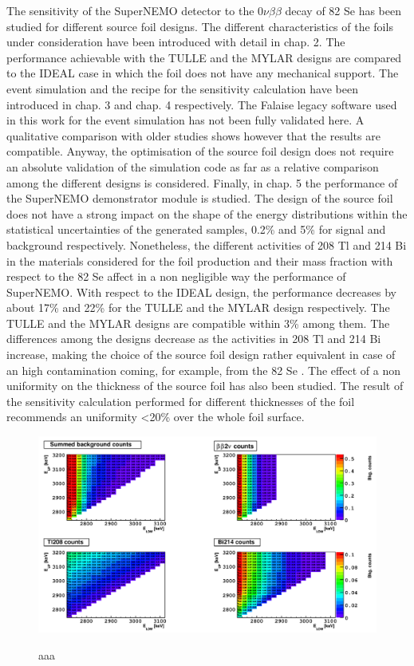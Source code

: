 \documentclass[main.tex]{subfiles}
\begin{document}
\NI The sensitivity of the SuperNEMO detector to the 0$\nu\beta\beta$ decay of 82 Se has been studied for different source foil designs. The different characteristics of the foils under consideration have been introduced with detail in chap. 2. The performance achievable with the TULLE and the MYLAR designs are compared to the IDEAL case in which the foil does not have any mechanical support. The event simulation and the recipe for the sensitivity calculation have been introduced in chap. 3 and chap. 4 respectively. The Falaise legacy software used in this work for the event simulation has not been fully validated here. A qualitative comparison with older studies shows however that the results are compatible. Anyway, the optimisation of the source foil design does not require an absolute validation of the simulation code as far as a relative comparison among the different designs is considered. Finally, in chap. 5 the performance of the SuperNEMO demonstrator module is studied. The design of the source foil does not have a strong impact on the shape of the energy distributions within the statistical uncertainties of the generated samples, 0.2\% and 5\% for signal and background respectively. Nonetheless, the different activities of 208 Tl and 214 Bi in the materials considered for the foil production and their mass fraction with respect to the 82 Se affect in a non negligible way the performance of SuperNEMO. With respect to the IDEAL design, the performance decreases by about 17\% and 22\% for the TULLE and the MYLAR design respectively. The TULLE and the MYLAR designs are compatible within 3\% among them. The differences among the designs decrease as the activities in 208 Tl and 214 Bi increase, making the choice of the source foil design rather equivalent in case of an high contamination coming, for example, from the 82 Se . The effect of a non uniformity on the thickness of the source foil has also been studied. The result of the sensitivity calculation performed for different thicknesses of the foil recommends an uniformity <20\% over the whole foil surface.



\begin{figure}[h!]
\centering
\includegraphics[scale=0.3]{pictures/Chap4/BkgCount2D.png}
\label{BkgCount2D.png}
\caption{aaa}
\end{figure}
\end{document}
